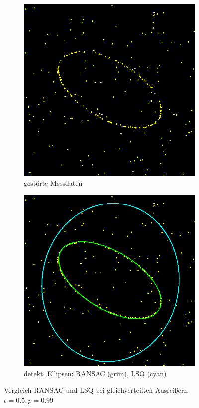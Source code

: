 \begin{figure}[!htb]
	\centering
	\begin{subfigure}{.5\textwidth}
		\centering
		\includegraphics[width=.9\textwidth]{images/ransac50_0.png}
		\caption{gestörte Messdaten}
	\end{subfigure}%
	\begin{subfigure}{.5\textwidth}
		\centering
		\includegraphics[width=.9\textwidth]{images/ransac50_1.png}
		\caption{detekt. Ellipsen: RANSAC (grün), LSQ (cyan)}
	\end{subfigure}
	\label{fig:bla}
	\caption{Vergleich RANSAC und LSQ bei gleichverteilten Ausreißern $\epsilon = 0.5, p = 0.99$}
\end{figure}

